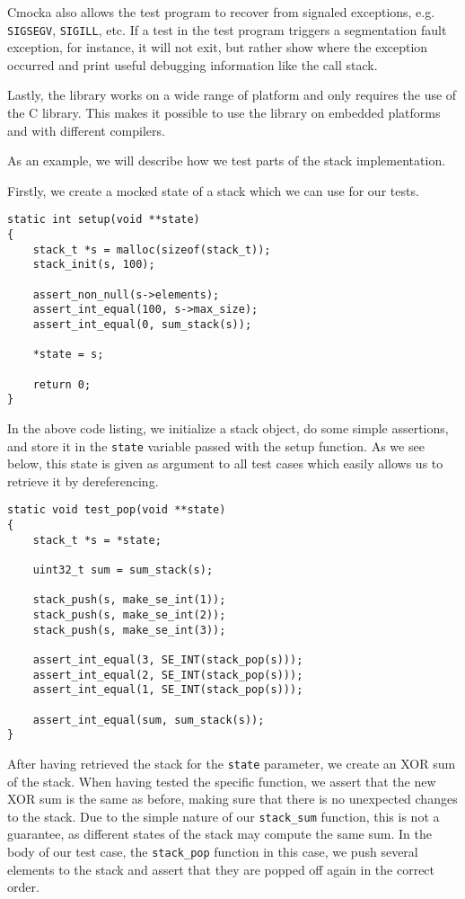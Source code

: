 Cmocka also allows the test program to recover from signaled exceptions,
e.g. {\tt SIGSEGV}, {\tt SIGILL}, etc. If a test in the test program triggers a
segmentation fault exception, for instance, it will not exit, but rather show
where the exception occurred and print useful debugging information like the
call stack.

Lastly, the library works on a wide range of platform and only requires the use
of the C library. This makes it possible to use the library on embedded
platforms and with different compilers.

As an example, we will describe how we test parts of the stack implementation.

Firstly, we create a mocked state of a stack which we can use for our tests.
\begin{lstlisting}[language={[ANSI]C},caption={Unit-test setup procedure}]
static int setup(void **state)
{
    stack_t *s = malloc(sizeof(stack_t));
    stack_init(s, 100);

    assert_non_null(s->elements);
    assert_int_equal(100, s->max_size);
    assert_int_equal(0, sum_stack(s));

    *state = s;

    return 0;
}
\end{lstlisting}

In the above code listing, we initialize a stack object, do some
simple assertions, and store it in the {\tt state} variable passed
with the setup function. As we see below, this state is given as
argument to all test cases which easily allows us to retrieve it by
dereferencing.
\begin{lstlisting}[language={[ANSI]C},caption={Unit-test of {\tt stack\_pop}}]
static void test_pop(void **state)
{
    stack_t *s = *state;

    uint32_t sum = sum_stack(s);

    stack_push(s, make_se_int(1));
    stack_push(s, make_se_int(2));
    stack_push(s, make_se_int(3));

    assert_int_equal(3, SE_INT(stack_pop(s)));
    assert_int_equal(2, SE_INT(stack_pop(s)));
    assert_int_equal(1, SE_INT(stack_pop(s)));

    assert_int_equal(sum, sum_stack(s));
}
\end{lstlisting}

After having retrieved the stack for the {\tt state} parameter, we create an XOR
sum of the stack. When having tested the specific function, we assert that the
new XOR sum is the same as before, making sure that there is no unexpected
changes to the stack. Due to the simple nature of our {\tt stack\_sum} function,
this is not a guarantee, as different states of the stack may compute the same
sum. %
In the body of our test case, the {\tt stack\_pop} function in this case, we
push several elements to the stack and assert that they are popped off again in
the correct order.

